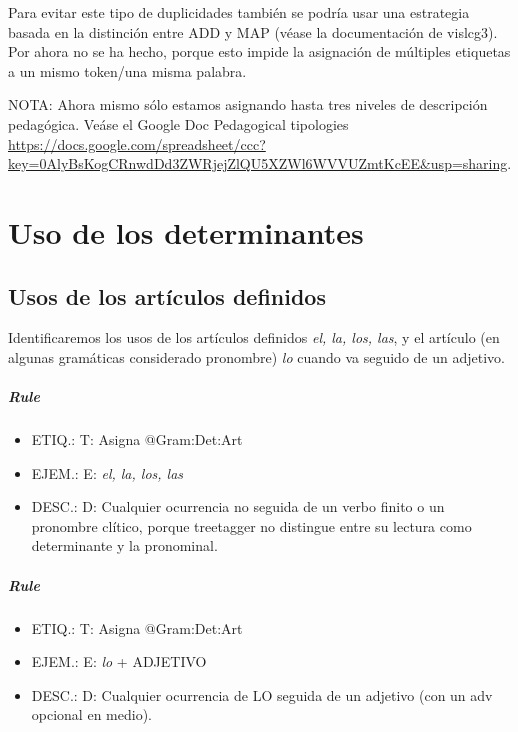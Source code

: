 \documentclass[11pt]{report}
\begin{document}
Para evitar este tipo de duplicidades también se podría usar una estrategia basada en la distinción entre ADD y MAP (véase la documentación de vislcg3). Por ahora no se ha hecho, porque esto impide la asignación de múltiples etiquetas a un mismo token/una misma palabra.

NOTA: Ahora mismo sólo estamos asignando hasta tres niveles de descripción pedagógica. Veáse el Google Doc Pedagogical tipologies \url{https://docs.google.com/spreadsheet/ccc?key=0AlyBsKogCRnwdDd3ZWRjejZlQU5XZWl6WVVUZmtKcEE&usp=sharing}.

\chapter{Uso de los determinantes}
\section{Usos de los artículos definidos}
Identificaremos los usos de los artículos definidos \emph{el, la, los, las}, y el artículo (en algunas gramáticas considerado pronombre) \emph{lo} cuando va seguido de un adjetivo.

\paragraph*{Rule}
\begin{itemize}
\item ETIQ.:  T: Asigna @Gram:Det:Art
\item EJEM.:  E: \emph{el, la, los, las}
\item DESC.:  D: Cualquier ocurrencia no seguida de un verbo finito o un pronombre clítico, porque treetagger no distingue entre su lectura como determinante y la pronominal.
\end{itemize}

\paragraph*{Rule}
\begin{itemize}
\item ETIQ.:  T: Asigna @Gram:Det:Art
\item EJEM.:  E: \emph{lo} + ADJETIVO
\item DESC.:  D: Cualquier ocurrencia de LO seguida de un adjetivo (con un adv opcional en medio).
\end{itemize}
\end{document}
